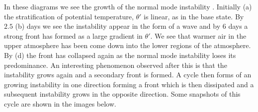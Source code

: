In these diagrams we see the growth of the normal mode instability . Initially (a) the stratification of potential temperature, $\theta '$ is linear, as in the base state. By $2.5$ (b) days we see the instability appear in the form of a wave and by $6$ days a strong front has formed as a large gradient in $\theta '$. We see that warmer air in the upper atmosphere has been come down into the lower regions of the atmosphere. By (d) the front has collapsed again as the normal mode instability loses its predominance. An interesting phenomenon observed after this is that the instability grows again and a secondary front is formed. A cycle then forms of an growing instability in one direction forming a front which is then dissipated and a subsequent instability grows in the opposite direction. Some snapshots of this cycle are shown in the images below. 
\pagebreak
